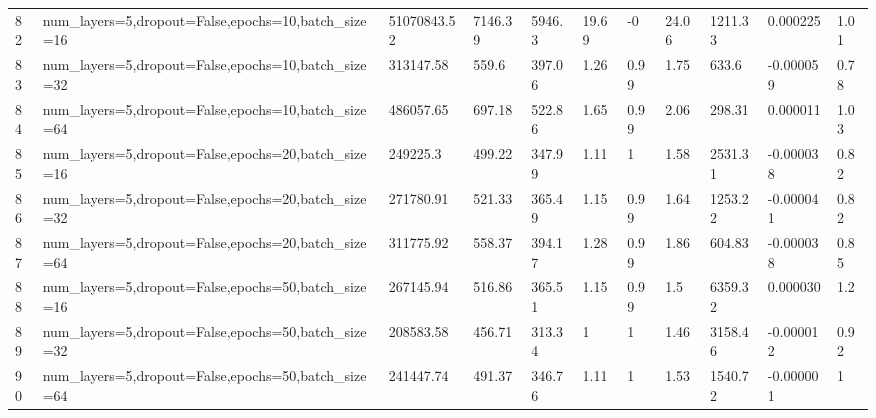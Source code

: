 \begin{longtable}{C{0.8cm} L{2cm} C{1.15cm} C{1.15cm} C{1.15cm} C{1.15cm} C{0.85cm} C{1.25cm} C{1.2cm} C{1.5cm} C{1.0cm}}
82 & num\_layers=5,\newline dropout=False,\newline epochs=10,\newline batch\_size=16 & 51070843.52 & 7146.39 & 5946.3 & 19.69 & -0 & 24.06 & 1211.33 & 0.000225 & 1.01 \\
83 & num\_layers=5,\newline dropout=False,\newline epochs=10,\newline batch\_size=32 & 313147.58 & 559.6 & 397.06 & 1.26 & 0.99 & 1.75 & 633.6 & -0.000059 & 0.78 \\
84 & num\_layers=5,\newline dropout=False,\newline epochs=10,\newline batch\_size=64 & 486057.65 & 697.18 & 522.86 & 1.65 & 0.99 & 2.06 & 298.31 & 0.000011 & 1.03 \\
85 & num\_layers=5,\newline dropout=False,\newline epochs=20,\newline batch\_size=16 & 249225.3 & 499.22 & 347.99 & 1.11 & 1 & 1.58 & 2531.31 & -0.000038 & 0.82 \\
86 & num\_layers=5,\newline dropout=False,\newline epochs=20,\newline batch\_size=32 & 271780.91 & 521.33 & 365.49 & 1.15 & 0.99 & 1.64 & 1253.22 & -0.000041 & 0.82 \\
87 & num\_layers=5,\newline dropout=False,\newline epochs=20,\newline batch\_size=64 & 311775.92 & 558.37 & 394.17 & 1.28 & 0.99 & 1.86 & 604.83 & -0.000038 & 0.85 \\
88 & num\_layers=5,\newline dropout=False,\newline epochs=50,\newline batch\_size=16 & 267145.94 & 516.86 & 365.51 & 1.15 & 0.99 & 1.5 & 6359.32 & 0.000030 & 1.2 \\
89 & num\_layers=5,\newline dropout=False,\newline epochs=50,\newline batch\_size=32 & 208583.58 & 456.71 & 313.34 & 1 & 1 & 1.46 & 3158.46 & -0.000012 & 0.92 \\
90 & num\_layers=5,\newline dropout=False,\newline epochs=50,\newline batch\_size=64 & 241447.74 & 491.37 & 346.76 & 1.11 & 1 & 1.53 & 1540.72 & -0.000001 & 1 \\
\end{longtable}
\endgroup



